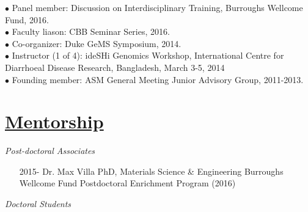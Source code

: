 \documentclass[overlapped,line,11pt]{res}
\begin{document}
\begin{resume}
\vspace{-10mm} \hangindent=0.5in $\bullet$\hspace{.1in} Panel member:
Discussion on Interdisciplinary Training, Burroughs Wellcome Fund, 2016. \\

\vspace{-10mm}
\hangindent=0.5in $\bullet$\hspace{.1in} Faculty liason: CBB Seminar Series, 2016. \\

\vspace{-10mm}
\hangindent=0.5in $\bullet$\hspace{.1in} Co-organizer: Duke GeMS
Symposium, 2014. \\

\vspace{-10mm}
\hangindent=0.5in $\bullet$\hspace{.1in} Instructor (1 of 4): ideSHi
Genomics Workshop, International Centre for Diarrhoeal
Disease Research, Bangladesh, March 3-5, 2014 \\

\vspace{-10mm}
\hangindent=0.5in $\bullet$\hspace{.1in} Founding member: ASM General Meeting
Junior Advisory Group, 2011-2013. 



\section{\underline{\sc Mentorship}}
\vspace{.1in}

\emph{Post-doctoral Associates}
\vspace{.1in}

\begin{itemize}[leftmargin=2cm, style=sameline, itemsep=0mm]

\item[2015-] Dr. Max Villa \newline 
  PhD, Materials Science \& Engineering \newline
  Burroughs Wellcome Fund Postdoctoral Enrichment Program (2016)
  
\end{itemize}

\vspace{-.1in}
\emph{Doctoral Students}
\vspace{.1in}


\end{resume}
\end{document}
